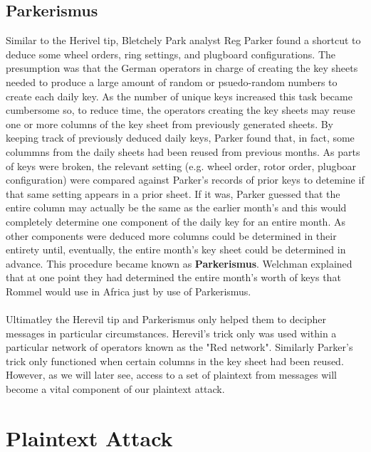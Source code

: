 \subsection{Parkerismus}
Similar to the Herivel tip, Bletchely Park analyst Reg Parker found a shortcut to deduce some wheel orders, ring settings, and plugboard configurations. The presumption was that the German operators in charge of creating the key sheets needed to produce a large amount of random or psuedo-random numbers to create each daily key. As the number of unique keys increased this task became cumbersome so, to reduce time, the operators creating the key sheets may reuse one or more columns of the key sheet from previously generated sheets. By keeping track of previously deduced daily keys, Parker found that, in fact, some colummns from the daily sheets had been reused from previous months. As parts of keys were broken, the relevant setting (e.g. wheel order, rotor order, plugboar configuration) were compared against Parker's records of prior keys to detemine if that same setting appears in a prior sheet. If it was, Parker guessed that the entire column may actually be the same as the earlier month's and this would completely determine one component of the daily key for an entire month. As other components were deduced more columns could be determined in their entirety until, eventually, the entire month's key sheet could be determined in advance. This procedure became known as {\bf{Parkerismus}}. Welchman explained that at one point they had determined the entire month's worth of keys that Rommel would use in Africa just by use of Parkerismus.
\\\\Ultimatley the Herevil tip and Parkerismus only helped them to decipher messages in particular circumstances. Herevil's trick only was used within a
particular network of operators known as the "Red network". Similarly Parker's trick only functioned when certain columns in the key sheet had been reused. However,
as we will later see, access to a set of plaintext from messages will
become a vital component of our plaintext attack.

\section{Plaintext Attack}

